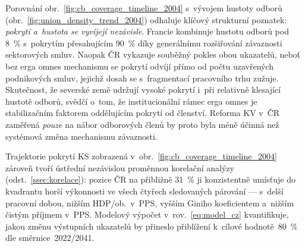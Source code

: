 

Porovnání obr.~\ref{fig:cb_coverage_timeline_2004} s~vývojem hustoty odborů
(obr.~\ref{fig:union_density_trend_2004}) odhaluje klíčový strukturní poznatek:
\emph{pokrytí a~hustota se vyvíjejí nezávisle}.
Francie kombinuje hustotu odborů pod \SI{8}{\percent} s~pokrytím přesahujícím
\SI{90}{\percent} díky generálnímu rozšiřování závaznosti sektorových smluv.
Naopak ČR vykazuje souběžný pokles obou ukazatelů, neboť bez erga omnes
mechanismu se pokrytí odvíjí přímo od počtu uzavřených podnikových smluv,
jejichž dosah se s~fragmentací pracovního trhu zužuje.
Skutečnost, že severské země udržují vysoké pokrytí i~při relativně klesající
hustotě odborů, svědčí o~tom, že institucionální rámec erga omnes je
stabilizačním faktorem oddělujícím pokrytí od členství.
Reforma \ac{KV} v~ČR zaměřená \emph{pouze} na nábor odborových členů by proto
byla méně účinná než systémová změna mechanismu závaznosti.

Trajektorie pokrytí \ac{KS} zobrazená v~obr.~\ref{fig:cb_coverage_timeline_2004}
zároveň tvoří ústřední nezávislou proměnnou korelační analýzy
(odst.~\ref{ssec:korelace}): pozice ČR na přibližně \SI{31}{\percent} ji
konzistentně umísťuje do kvadrantu horší výkonnosti ve všech čtyřech
sledovaných párování --- s~delší pracovní dobou, nižším HDP/ob.~v~PPS,
vyšším Giniho koeficientem a~nižším čistým příjmem v~PPS.
Modelový výpočet v~rov.~\eqref{eq:model_cz} kvantifikuje, jakou změnu
výstupních ukazatelů by přineslo přiblížení k~cílové hodnotě~\SI{80}{\percent}
dle směrnice~2022/2041.
